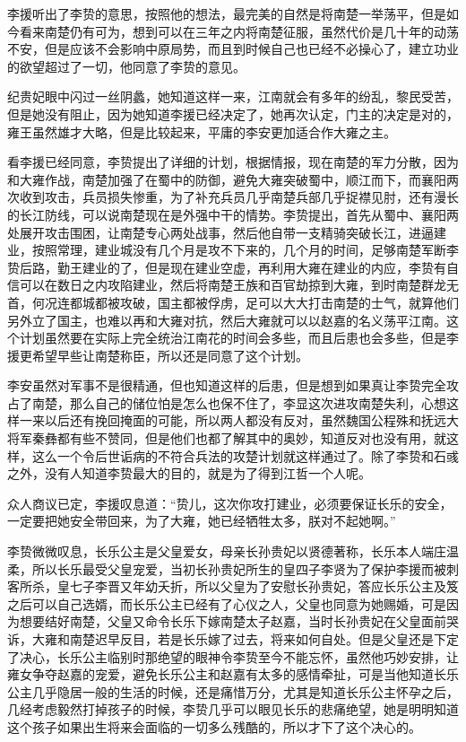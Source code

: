 李援听出了李贽的意思，按照他的想法，最完美的自然是将南楚一举荡平，但是如今看来南楚仍有可为，想到可以在三年之内将南楚征服，虽然代价是几十年的动荡不安，但是应该不会影响中原局势，而且到时候自己也已经不必操心了，建立功业的欲望超过了一切，他同意了李贽的意见。

纪贵妃眼中闪过一丝阴蠡，她知道这样一来，江南就会有多年的纷乱，黎民受苦，但是她没有阻止，因为她知道李援已经决定了，她再次认定，门主的决定是对的，雍王虽然雄才大略，但是比较起来，平庸的李安更加适合作大雍之主。

看李援已经同意，李贽提出了详细的计划，根据情报，现在南楚的军力分散，因为和大雍作战，南楚加强了在蜀中的防御，避免大雍突破蜀中，顺江而下，而襄阳两次收到攻击，兵员损失惨重，为了补充兵员几乎南楚兵部几乎捉襟见肘，还有漫长的长江防线，可以说南楚现在是外强中干的情势。李贽提出，首先从蜀中、襄阳两处展开攻击围困，让南楚专心两处战事，然后他自带一支精骑突破长江，进逼建业，按照常理，建业城没有几个月是攻不下来的，几个月的时间，足够南楚军断李贽后路，勤王建业的了，但是现在建业空虚，再利用大雍在建业的内应，李贽有自信可以在数日之内攻陷建业，然后将南楚王族和百官劫掠到大雍，到时南楚群龙无首，何况连都城都被攻破，国主都被俘虏，足可以大大打击南楚的士气，就算他们另外立了国主，也难以再和大雍对抗，然后大雍就可以以赵嘉的名义荡平江南。这个计划虽然要在实际上完全统治江南花的时间会多些，而且后患也会多些，但是李援更希望早些让南楚称臣，所以还是同意了这个计划。

李安虽然对军事不是很精通，但也知道这样的后患，但是想到如果真让李贽完全攻占了南楚，那么自己的储位怕是怎么也保不住了，李显这次进攻南楚失利，心想这样一来以后还有挽回掩面的可能，所以两人都没有反对，虽然魏国公程殊和抚远大将军秦彝都有些不赞同，但是他们也都了解其中的奥妙，知道反对也没有用，就这样，这么一个令后世诟病的不符合兵法的攻楚计划就这样通过了。除了李贽和石彧之外，没有人知道李贽最大的目的，就是为了得到江哲一个人呢。

众人商议已定，李援叹息道：“贽儿，这次你攻打建业，必须要保证长乐的安全，一定要把她安全带回来，为了大雍，她已经牺牲太多，朕对不起她啊。”

李贽微微叹息，长乐公主是父皇爱女，母亲长孙贵妃以贤德著称，长乐本人端庄温柔，所以长乐最受父皇宠爱，当初长孙贵妃所生的皇四子李贤为了保护李援而被刺客所杀，皇七子李晋又年幼夭折，所以父皇为了安慰长孙贵妃，答应长乐公主及笈之后可以自己选婿，而长乐公主已经有了心仪之人，父皇也同意为她赐婚，可是因为想要结好南楚，父皇又命令长乐下嫁南楚太子赵嘉，当时长孙贵妃在父皇面前哭诉，大雍和南楚迟早反目，若是长乐嫁了过去，将来如何自处。但是父皇还是下定了决心，长乐公主临别时那绝望的眼神令李贽至今不能忘怀，虽然他巧妙安排，让雍女争夺赵嘉的宠爱，避免长乐公主和赵嘉有太多的感情牵扯，可是当他知道长乐公主几乎隐居一般的生活的时候，还是痛惜万分，尤其是知道长乐公主怀孕之后，几经考虑毅然打掉孩子的时候，李贽几乎可以眼见长乐的悲痛绝望，她是明明知道这个孩子如果出生将来会面临的一切多么残酷的，所以才下了这个决心的。


